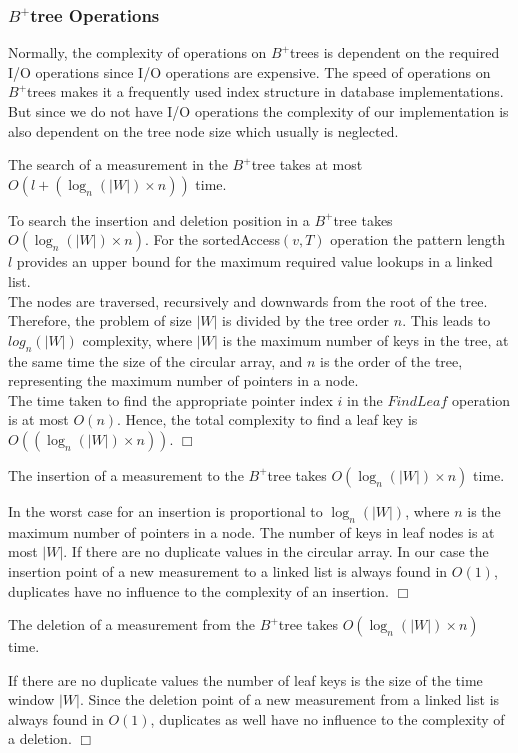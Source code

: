 \documentclass[abstracton,12pt,oneside]{scrreprt}
\newenvironment{proof}
  {\noindent{\bf Proof:\rm}}{\hfill$\Box$\vspace{\medskipamount}}
\begin{document}
\subsubsection{$B^+$tree Operations}

Normally, the complexity of operations on $B^+$trees is dependent on the 
required I/O operations since I/O operations are expensive. The speed of operations on $B^+$trees makes it a frequently used index structure in database implementations. But since we do not have I/O operations the complexity of our implementation is also dependent on the tree node size which usually is neglected.


\begin{mydef}
	The search of a measurement in the $B^+$tree takes at most $O(l + (\log_{n}(|W|) \times n))$ time.
	\label{def1}
\end{mydef}
\begin{proof}
	To search the insertion and deletion position in a $B^+$tree takes $O(\log_{n}(|W|) \times n)$. For the sortedAccess$(v,T)$ operation the pattern length $l$ provides an upper bound for the maximum required value lookups in a linked list.\\ The nodes are traversed, recursively and downwards from the root of the tree. Therefore, the problem of size $|W|$ is divided by the tree order $n$. This leads to $log_n(|W|)$ complexity, where $|W|$ is the maximum number of keys in the tree, at the same time the size of the circular array, and $n$ is the order of the tree, representing the maximum number of pointers in a node. \\The time taken to find the appropriate pointer index $i$ in the $FindLeaf$ operation is at most $O(n)$. Hence, the total complexity to find a leaf key is $O((\log_{n}(|W|) \times n))$. 
\end{proof}

\begin{mydef}
	The insertion of a measurement to the $B^+$tree takes $O(\log_{n}(|W|) \times n)$ time.
\end{mydef}
\begin{proof}
	In the worst case for an insertion is proportional to $\log_{n}(|W|)$, where $n$ is the maximum number of pointers in a node. The number of keys in leaf nodes is at most $|W|$. If there are no duplicate values in the circular array. In our case the insertion point of a new measurement to a linked list is always found in $O(1)$, duplicates have no influence to the complexity of an insertion.  
\end{proof}
\begin{mydef}
	The deletion of a measurement from the $B^+$tree takes $O(\log_{n}(|W|) \times n)$ time.
\end{mydef}
\begin{proof}
	 If there are no duplicate values the number of leaf keys is the size of the time window $|W|$. Since the deletion point of a new measurement from a linked list is always found in $O(1)$, duplicates as well have no influence to the complexity of a deletion. 
\end{proof}
\end{document}
